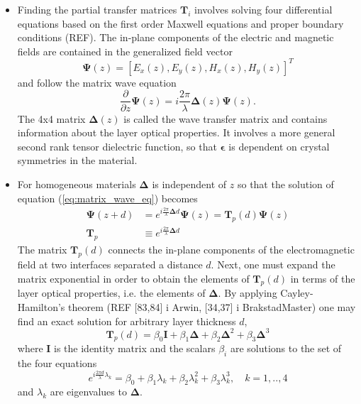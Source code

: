 \begin{itemize}
    \item Finding the partial transfer matrices $\mathbf{T}_i$ involves solving four differential equations based on the first order Maxwell equations and proper boundary conditions (REF). The in-plane components of the electric and magnetic fields are contained in the generalized field vector
    \begin{equation}
        \mathbf{\Psi}(z) = [E_x(z), E_y(z), H_x(z), H_y(z)]^T
    \end{equation}
    and follow the matrix wave equation
    \begin{equation}
        \frac{\partial}{\partial z}\mathbf{\Psi}(z) = i\frac{2\pi}{\lambda}\mathbf{\Delta}(z)\mathbf{\Psi}(z).
        \label{eq:matrix_wave_eq}
    \end{equation}
    The 4x4 matrix $\mathbf{\Delta}(z)$ is called the wave transfer matrix and contains information about the layer optical properties. It involves a more general second rank tensor dielectric function, so that $\mathbf{\epsilon}$ is dependent on crystal symmetries in the material.
    
    \item For homogeneous materials $\mathbf{\Delta}$ is independent of $z$ so that the solution of equation (\ref{eq:matrix_wave_eq}) becomes 
    \begin{subequations}
    \begin{align}
        \mathbf{\Psi}(z+d) &= e^{i\frac{2\pi}{\lambda}\mathbf{\Delta}d} \mathbf{\Psi}(z) = \mathbf{T}_p(d) \mathbf{\Psi}(z)    \\
        \mathbf{T}_p &\equiv e^{i\frac{2\pi}{\lambda}\mathbf{\Delta}d}
    \end{align}
    \end{subequations}
    The matrix $\mathbf{T}_p(d)$ connects the in-plane components of the electromagnetic field at two interfaces separated a distance $d$. Next, one must expand the matrix exponential in order to obtain the elements of $\mathbf{T}_p(d)$ in terms of the layer optical properties, i.e. the elements of  $\mathbf{\Delta}$. By applying Cayley-Hamilton's theorem (REF [83,84] i Arwin, [34,37] i BrakstadMaster) one may find an exact solution for arbitrary layer thickness $d$,
    \begin{equation}
        \mathbf{T}_p(d) = \beta_0\mathbf{I} + \beta_1\mathbf{\Delta} + \beta_2\mathbf{\Delta}^2 + \beta_3\mathbf{\Delta}^3
    \end{equation}
    where $\mathbf{I}$ is the identity matrix and the scalars $\beta_i$ are solutions to the set of the four equations
    \begin{equation}
        e^{i\frac{2\pi d}{\lambda}\lambda_k} = \beta_0 + \beta_1 \lambda_k + \beta_2 \lambda_k^2 + \beta_3 \lambda_k^3, \quad k=1,..,4
    \end{equation}
    and $\lambda_k$ are eigenvalues to $\mathbf{\Delta}$.
\end{itemize}

